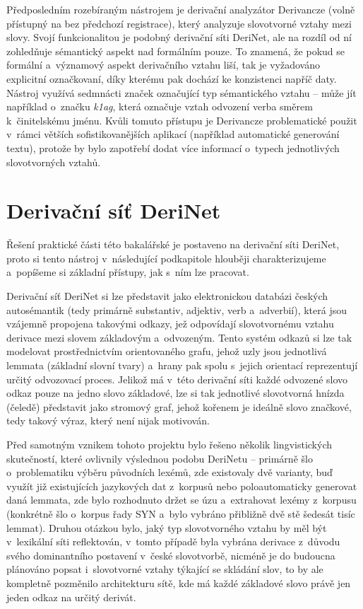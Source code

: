 Předposledním rozebíraným nástrojem je derivační analyzátor Derivancze
(volně přístupný na bez předchozí registrace), který analyzuje
slovotvorné vztahy mezi slovy. Svojí funkcionalitou je podobný derivační
síti DeriNet, ale na rozdíl od ní zohledňuje sémantický aspekt nad
formálním pouze. To znamená, že pokud se formální a~významový aspekt
derivačního vztahu liší, tak je vyžadováno explicitní označkovaní, díky
kterému pak dochází ke konzistenci napříč daty. Nástroj využívá
sedmnácti značek označující typ sémantického vztahu -- může jít
například o~značku \emph{k1ag}, která označuje vztah odvození verba
směrem k~činitelskému jménu. Kvůli tomuto přístupu je Derivancze
problematické použit v~rámci větších sofistikovanějších aplikací
(například automatické generování textu), protože by bylo zapotřebí
dodat více informací o~typech jednotlivých slovotvorných vztahů.
\parencite{derivancze}

\hypertarget{derivaux10dnuxed-suxedux165-derinet}{%
\section{Derivační síť
DeriNet}\label{derivaux10dnuxed-suxedux165-derinet}}

Řešení praktické části této bakalářské je postaveno na derivační síti
DeriNet, proto si tento nástroj v~následující podkapitole hlouběji
charakterizujeme a~popíšeme si základní přístupy, jak s~ním lze
pracovat.

Derivační síť DeriNet si lze představit jako elektronickou databázi
českých autosémantik (tedy primárně substantiv, adjektiv, verb a~adverbií), která jsou vzájemně propojena takovými odkazy, jež odpovídají
slovotvornému vztahu derivace mezi slovem základovým a~odvozeným. Tento
systém odkazů si lze tak modelovat prostřednictvím orientovaného grafu,
jehož uzly jsou jednotlivá lemmata (základní slovní tvary) a~hrany pak
spolu s~jejich orientací reprezentují určitý odvozovací proces. Jelikož
má v~této derivační síti každé odvozené slovo odkaz pouze na jedno slovo
základové, lze si tak jednotlivé slovotvorná hnízda (čeledě) představit
jako stromový graf, jehož kořenem je ideálně slovo značkové, tedy takový
výraz, který není nijak motivován.~\parencite{derinet-cz}

Před samotným vznikem tohoto projektu bylo řešeno několik lingvistických
skutečností, které ovlivnily výslednou podobu DeriNetu -- primárně šlo
o~problematiku výběru původních lexémů, zde existovaly dvě varianty, buď
využít již existujících jazykových dat z~korpusů nebo poloautomaticky
generovat daná lemmata, zde bylo rozhodnuto držet se úzu a~extrahovat
lexémy z~korpusu (konkrétně šlo o~korpus řady SYN a~bylo vybráno
přibližně dvě stě šedesát tisíc lemmat). Druhou otázkou bylo, jaký typ
slovotvorného vztahu by měl být v~lexikální síti reflektován, v~tomto
případě byla vybrána derivace z~důvodu svého dominantního postavení
v~české slovotvorbě, nicméně je do budoucna plánováno popsat i~slovotvorné
vztahy týkající se skládání slov, to by ale kompletně pozměnilo
architekturu sítě, kde má každé základové slovo právě jen jeden odkaz na
určitý derivát.~\parencite{sevcikova14}

